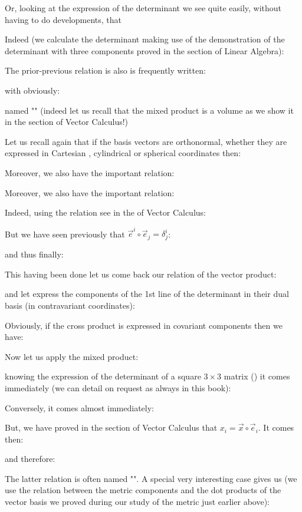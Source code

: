 	Or, looking at the expression of the determinant we see quite easily, without having to do developments, that
	
	Indeed (we calculate the determinant making use of the demonstration of the determinant with three components proved in the section of Linear Algebra):
	
	The prior-previous relation is also is frequently written:
	
	with obviously:
	
	named "" (indeed let us recall that the mixed product is a volume as we show it in the section of Vector Calculus!)
	\begin{tcolorbox}[title=Remark,colframe=black,arc=10pt]
	Let us recall again that if the basis vectors are orthonormal, whether they are expressed in Cartesian , cylindrical or spherical coordinates then:
	
	\end{tcolorbox}
	Moreover, we also have the important relation:
	
	Moreover, we also have the important relation:
	
	Indeed, using the relation see in the of Vector Calculus:
	
	But we have seen previously that $\vec{e}^i\circ\vec{e}_j=\delta_j^i$:
	
	and thus finally:
	
	This having been done let us come back our relation of the vector product:
	
	and let express the components of the 1st line of the determinant in their dual basis (in contravariant coordinates):
	
	Obviously, if the cross product is expressed in covariant components then we have:
	
	Now let us apply the mixed product:
	
	knowing the expression of the determinant of a square $3\times 3$ matrix  () it comes immediately (we can detail on request as always in this book):
	
	Conversely, it comes almost immediately:
	
	But, we have proved in the section of Vector Calculus that $x_i=\vec{x}\circ\vec{e}_i$. It comes then:
	
	and therefore:
	
	The latter relation is often named "". A special very interesting case gives us (we use the relation between the metric components and the dot products of the vector basis we proved during our study of the metric just earlier above):
	
